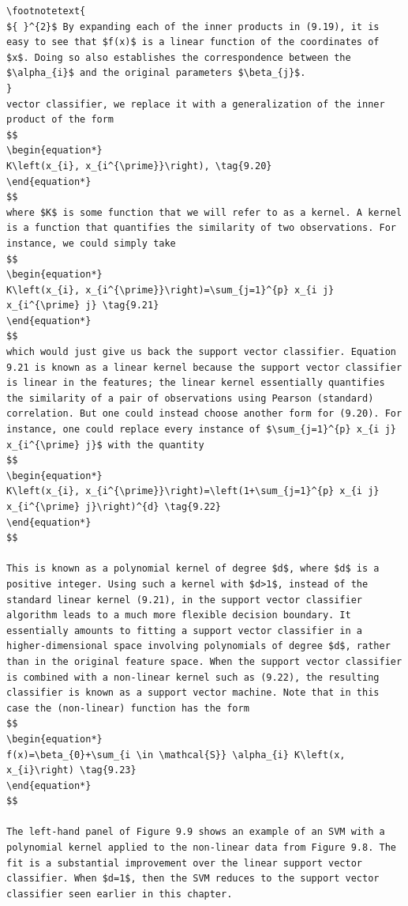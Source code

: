\documentclass[10pt]{article}
\let\svthefootnote\thefootnote
\newcommand\blfootnotetext[1]{%
  \let\thefootnote\relax\footnote{#1}%
  \addtocounter{footnote}{-1}%
  \let\thefootnote\svthefootnote%
}
\let\svfootnotetext\footnotetext
\renewcommand\footnotetext[2][?]{%
  \if\relax#1\relax%
    \ifnum\value{footnote}=0\blfootnotetext{#2}\else\svfootnotetext{#2}\fi%
  \else%
    \if?#1\ifnum\value{footnote}=0\blfootnotetext{#2}\else\svfootnotetext{#2}\fi%
    \else\svfootnotetext[#1]{#2}\fi%
  \fi
}
\begin{document}
\begin{verbatim}
\footnotetext{
${ }^{2}$ By expanding each of the inner products in (9.19), it is easy to see that $f(x)$ is a linear function of the coordinates of $x$. Doing so also establishes the correspondence between the $\alpha_{i}$ and the original parameters $\beta_{j}$.
}
vector classifier, we replace it with a generalization of the inner product of the form
$$
\begin{equation*}
K\left(x_{i}, x_{i^{\prime}}\right), \tag{9.20}
\end{equation*}
$$
where $K$ is some function that we will refer to as a kernel. A kernel is a function that quantifies the similarity of two observations. For instance, we could simply take
$$
\begin{equation*}
K\left(x_{i}, x_{i^{\prime}}\right)=\sum_{j=1}^{p} x_{i j} x_{i^{\prime} j} \tag{9.21}
\end{equation*}
$$
which would just give us back the support vector classifier. Equation 9.21 is known as a linear kernel because the support vector classifier is linear in the features; the linear kernel essentially quantifies the similarity of a pair of observations using Pearson (standard) correlation. But one could instead choose another form for (9.20). For instance, one could replace every instance of $\sum_{j=1}^{p} x_{i j} x_{i^{\prime} j}$ with the quantity
$$
\begin{equation*}
K\left(x_{i}, x_{i^{\prime}}\right)=\left(1+\sum_{j=1}^{p} x_{i j} x_{i^{\prime} j}\right)^{d} \tag{9.22}
\end{equation*}
$$

This is known as a polynomial kernel of degree $d$, where $d$ is a positive integer. Using such a kernel with $d>1$, instead of the standard linear kernel (9.21), in the support vector classifier algorithm leads to a much more flexible decision boundary. It essentially amounts to fitting a support vector classifier in a higher-dimensional space involving polynomials of degree $d$, rather than in the original feature space. When the support vector classifier is combined with a non-linear kernel such as (9.22), the resulting classifier is known as a support vector machine. Note that in this case the (non-linear) function has the form
$$
\begin{equation*}
f(x)=\beta_{0}+\sum_{i \in \mathcal{S}} \alpha_{i} K\left(x, x_{i}\right) \tag{9.23}
\end{equation*}
$$

The left-hand panel of Figure 9.9 shows an example of an SVM with a polynomial kernel applied to the non-linear data from Figure 9.8. The fit is a substantial improvement over the linear support vector classifier. When $d=1$, then the SVM reduces to the support vector classifier seen earlier in this chapter.


\end{verbatim}
\end{document}
